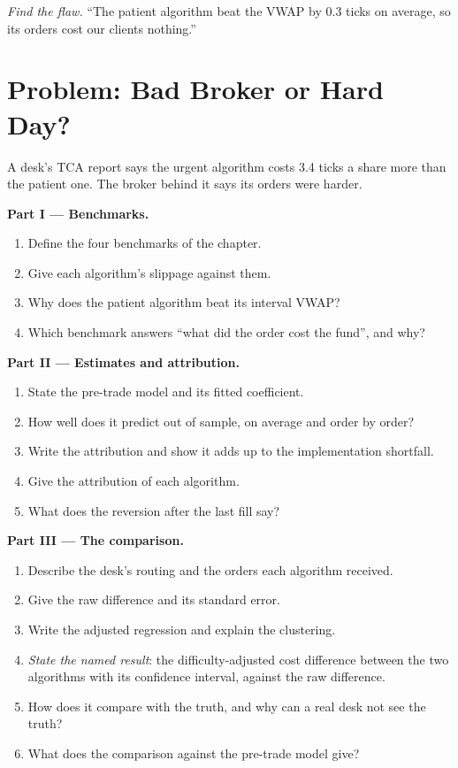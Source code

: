 \begin{exercise}[$\star\star\star$]\label{exo:mx:transaction-cost-analysis:8}
\emph{Find the flaw.} ``The patient algorithm beat the VWAP by 0.3 ticks on average, so its orders cost our clients nothing.''
\end{exercise}

\section{Problem: Bad Broker or Hard Day?}

\begin{problem}\label{pb:mx:transaction-cost-analysis:1}
A desk's TCA report says the urgent algorithm costs 3.4 ticks a share more than the patient one. The broker behind it says its orders were harder.

\medskip\noindent\textbf{Part I --- Benchmarks.}
\begin{enumerate}
\item Define the four benchmarks of the chapter.
\item Give each algorithm's slippage against them.
\item Why does the patient algorithm beat its interval VWAP?
\item Which benchmark answers ``what did the order cost the fund'', and why?
\end{enumerate}

\medskip\noindent\textbf{Part II --- Estimates and attribution.}
\begin{enumerate}[resume]
\item State the pre-trade model and its fitted coefficient.
\item How well does it predict out of sample, on average and order by order?
\item Write the attribution and show it adds up to the implementation shortfall.
\item Give the attribution of each algorithm.
\item What does the reversion after the last fill say?
\end{enumerate}

\medskip\noindent\textbf{Part III --- The comparison.}
\begin{enumerate}[resume]
\item Describe the desk's routing and the orders each algorithm received.
\item Give the raw difference and its standard error.
\item Write the adjusted regression and explain the clustering.
\item \emph{State the named result}: the difficulty-adjusted cost difference between the two algorithms with its confidence interval, against the
raw difference.
\item How does it compare with the truth, and why can a real desk not see the truth?
\item What does the comparison against the pre-trade model give?
\end{enumerate}


\end{problem}
